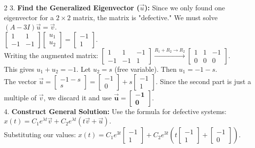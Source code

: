 \documentclass[4pt]{extarticle}
\begin{document}
\begin{multicols}{2}
3. \textbf{Find the Generalized Eigenvector ($\vec{u}$):} Since we only found one eigenvector for a $2 \times 2$ matrix, the matrix is "defective." We must solve $(A - 3I)\vec{u} = \vec{v}$. \\
$\begin{bmatrix} 1 & 1 \\ -1 & -1 \end{bmatrix} \begin{bmatrix} u_1 \\ u_2 \end{bmatrix} = \begin{bmatrix} -1 \\ 1 \end{bmatrix}$. \\
Writing the augmented matrix: $\left[ \begin{array}{cc|c} 1 & 1 & -1 \\ -1 & -1 & 1 \end{array} \right] \xrightarrow{R_1+R_2 \to R_2} \left[ \begin{array}{cc|c} 1 & 1 & -1 \\ 0 & 0 & 0 \end{array} \right]$. \\
This gives $u_1 + u_2 = -1$. Let $u_2 = s$ (free variable). Then $u_1 = -1 - s$. \\
The vector $\vec{u} = \begin{bmatrix} -1-s \\ s \end{bmatrix} = \begin{bmatrix} -1 \\ 0 \end{bmatrix} + s \begin{bmatrix} -1 \\ 1 \end{bmatrix}$. Since the second part is just a multiple of $\vec{v}$, we discard it and use $\mathbf{\vec{u} = \begin{bmatrix} -1 \\ 0 \end{bmatrix}}$. \\
4. \textbf{Construct General Solution:} Use the formula for defective systems: \\
$x(t) = C_1 e^{\lambda t}\vec{v} + C_2 e^{\lambda t}(t\vec{v} + \vec{u})$. \\
Substituting our values: $x(t) = C_1 e^{3t} \begin{bmatrix} -1 \\ 1 \end{bmatrix} + C_2 e^{3t} \left( t \begin{bmatrix} -1 \\ 1 \end{bmatrix} + \begin{bmatrix} -1 \\ 0 \end{bmatrix} \right)$.


\end{multicols}
\end{document}
